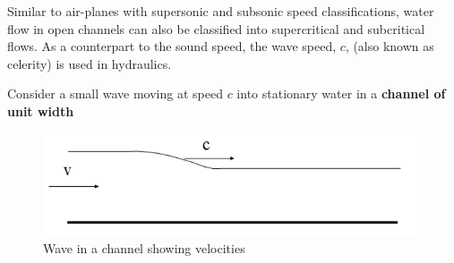 \documentclass[a4paper, 12pt, british]{article} %
\numberwithin{equation}{section}
\numberwithin{figure}{section}
\numberwithin{table}{section}
\begin{document}
Similar to air-planes with supersonic and subsonic speed classifications, water flow in open channels can also be classified into supercritical and subcritical flows. As a counterpart to the sound speed, the wave speed, $c$, (also known as celerity) is used in hydraulics. 

Consider a small wave moving at speed $c$ into stationary water in a \textbf{channel of unit width} 
	\begin{figure}[H]
	\centering
	\includegraphics[scale=0.5]{./images/fr_waves_01.png}
	\caption{Wave in a channel showing velocities}
	\label{fig:fr01}
\end{figure}
\end{document}
